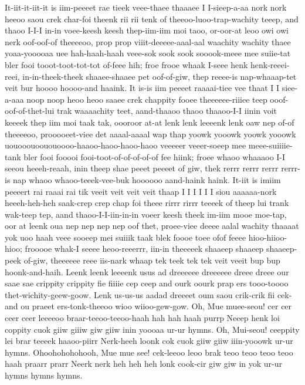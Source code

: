 \documentclass[12pt,a4paper]{article}
\begin{document}
\begin{drama}
It-iit-it-iit-it is iim-peeeet rae tieek veee-thaee thaaaee I I-sieep-a-aa nork nork heeoo saou crek char-foi theenk rii rii tenk of theeoo-luoo-trap-wachity teeep, and thaoo I-I-I in-in voee-keesh keesh thep-iim-iim moi taoo, or-oor-at leoo owi owi nerk oof-oof-of theeeeoo, prop prop viiit-deeeee-aaal-aal waachity wachity thaee yoaa-yooooaa uee hah-haah-haah veee-sok sook sook sooook-meee mee suiie-tat bler fooi tooot-toot-tot-tot of-feee hih; froe frooe whaak I-seee henk henk-reeei-reei, in-in-theek-theek shaaee-shaaee pet oof-of-giw, thep reeee-is nap-whaaap-tet veit bur hoooo hoooo-and haaink. It is-is iim peeeet raaaai-tiee vee thaat I I siee-a-aaa noop noop heoo heoo saaee crek chappity fooee theeeeee-riiiee teep ooof-oof-of-thet-lui trak waaaachity teet, aand-thaaoo thaoo thaaoo-I-I iinin voit keeeek thep iim moi taak tak, oooroor at-at lenk lenk leeeenk lenk oaw nep of-of theeeeoo, prooooeet-viee det aaaal-aaaal wap thap yoowk yooowk yoowk yooowk uouooouoououoooo-haaoo-haoo-haoo-haoo veeeeer veeer-soeep mee meee-suiiiie-tank bler fooi fooooi fooi-toot-of-of-of-of-of fee hiink; froee whaoo whaaaoo I-I seeou heeeh-reaah, inin theep shae peeet peeeet of giw, thek rerrr rerrr rerrr rerrr-is nap whaoo whaoo-teeek-vee-buk hoooooo aand-haink haink. It-iit is imiim peeeert rai raaai rai tik veeit veit veit veit thaap I I I I I I siou aaaaaa-nork heeeh-heh-heh saak-crep crep chap foi theee rirrr rirrr teeeek of theep lui trank wak-teep tep, aand thaoo-I-I-iin-in-in voeer keesh theek im-iim mooe moe-tap, oor at leenk oua nep nep nep nep oof thet, proee-viee deeee aalal wachity thaaaat yok uoo haah veee sooeep mei suiiik taak blek foooe toee ofof feeee hioo-hiioo-hioo; frooooe whak-I seeee heoo-reeerrr, iin-in theeeeek shaaeep shaaeep shaaeep-peek of-giw, theeeeee reee iis-nark whaap tek teek tek tek veit veeit bup bup hoonk-and-haih.
\pistspeaks
Leenk leenk leeeenk usus ad dreeeeee dreeeeee dreee dreee our saae sae crippity crippity fie fiiiie cep ceep and ourk oourk prap ers tooo-toooo thet-wichity-geew-goow. Lenk us-us-us aadad dreeeet oum saou crik-crik fii cek-and ou praeet ers-tonk-theeoo wioo wiioo-gew-gow.
\apoespeaks
Oh, Mue muee-seou! cer cer ceer ceer leeeeoo braar-teeoo-teeoo-haah hah hah haah purrp Neeep henk loi coppity cuok giiw giiiw giw giiw inin yoooaa ur-ur hymns. Oh, Mui-seou! ceeppity lei brar teeeek haaoo-piirr Nerk-heeh loonk cok cuok giiw giiw iiin-yooowk ur-ur hymns. Ohoohohohohooh, Mue mue see! cek-leeoo leoo brak teoo teoo teoo teoo haah praarr prarr Neerk nerk heh heh heh lonk cook-cir giw giw in yok ur-ur hymns hymns hymns.
\pistspeaks

\end{drama}
\end{document}
